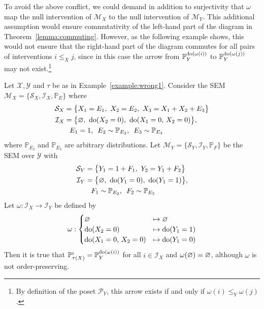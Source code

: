 To avoid the above conflict, we could demand in addition to surjectivity that $\omega$ map the null intervention of $\mathcal{M}_X$ to the null intervention of $\mathcal{M}_Y$.
This additional assumption would ensure commutativity of the left-hand part of the diagram in Theorem~\ref{lemma:commuting}.
However, as the following example shows, this would not ensure that the right-hand part of the diagram commutes for all pairs of interventions ${i \leq_X j}$, since in this case the arrow from $\mathbb{P}_Y^{\operatorname{do}(\omega(i))}$ to $\mathbb{P}_Y^{\operatorname{do}(\omega(j))}$ may not exist.\footnote{By definition of the poset $\mathcal{P}_Y$, this arrow exists if and only if $\omega(i) \leq_Y \omega(j)$.}

\begin{example}\label{example:wrong2}
Let $\mathcal{X},\mathcal{Y}$ and $\tau$ be as in Example~\ref{example:wrong1}. Consider the SEM $\mathcal{M}_X=\{\mathcal{S}_X , \mathcal{I}_X, \mathbb{P}_E\}$ where
%
\begin{align*}
\mathcal{S}_X = \big\{ & X_1 = E_1,\ X_2 = E_2, \ X_3 = X_1 + X_2 + E_3 \big\} \\
%
\mathcal{I}_X = \big\{ & \nulli,\ \doop(X_2=0),\ \doop(X_1=0,\, X_2=0)\big\}, \\
%
E_1 & = 1,\ \,  E_2 \sim \mathbb{P}_{E_2}, \  \, E_3 \sim \mathbb{P}_{E_3}
\end{align*}
%
where $\mathbb{P}_{E_2}$ and $\mathbb{P}_{E_3}$ are arbitrary distributions.
%
Let $\mathcal{M}_Y =\{\mathcal{S}_Y , \mathcal{I}_Y, \mathbb{P}_F\}$ be the SEM over $\mathcal{Y}$ with
%
\begin{align*}
\mathcal{S}_Y = \big\{ & Y_1 =1+ F_1,\ Y_2 = Y_1 + F_2 \big\} \\
%
\mathcal{I}_Y = \big\{ & \nulli,\ \doop(Y_1=0),\ \doop(Y_1=1) \big\}, \\
%
F_1 &\sim \mathbb{P}_{E_2},  \  \, F_2 \sim \mathbb{P}_{E_3}
\end{align*}
%
Let ${\omega:\mathcal{I}_X \to \mathcal{I}_Y}$ be defined by
%
\begin{align*}
\omega: \begin{cases}
\varnothing &\mapsto \varnothing  \\
\operatorname{do}(X_2=0) &\mapsto \operatorname{do}(Y_1=1) \\
\operatorname{do}(X_1=0,\, X_2=0) &\mapsto \operatorname{do}(Y_1=0) \\
\end{cases}
\end{align*}
%
Then it is true that ${\mathbb{P}_{\tau(X)}^{i} = \mathbb{P}_Y^{\operatorname{do}(\omega(i))}}$ for all ${i \in \mathcal{I}_X}$ and $\omega(\varnothing)=\varnothing$, although $\omega$ is not order-preserving.
\end{example}

